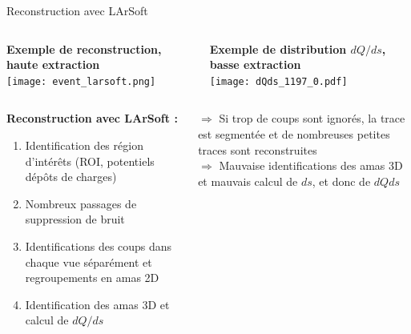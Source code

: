     \begin{frame}{Reconstruction avec LArSoft}
        \begin{scriptsize}
            \begin{columns}
                \begin{column}{0.65\textwidth}
                    \centering \textbf{Exemple de reconstruction, haute extraction}\\
                    \centering \texttt{[image: event\_larsoft.png]}
                \end{column}
                \begin{column}{0.35\textwidth}
                    \centering \textbf{Exemple de distribution $dQ/ds$, basse extraction}\\
                    \centering \texttt{[image: dQds\_1197\_0.pdf]}
                \end{column}
            \end{columns}\vfill
            \begin{columns}
                \begin{column}{0.5\textwidth}
                    \textbf{Reconstruction avec LArSoft :}
                    \begin{enumerate}
                        \item Identification des région d'intérêts (ROI, potentiels dépôts de charges)
                        \item Nombreux passages de suppression de bruit
                        \item Identifications des coups dans chaque vue séparément et regroupements en amas 2D
                        \item Identification des amas 3D et calcul de $dQ/ds$
                    \end{enumerate}
                \end{column}
                \begin{column}{0.5\textwidth}
                    $\Rightarrow$ Si trop de coups sont ignorés, la trace est segmentée et de nombreuses petites traces sont reconstruites\\
                    $\Rightarrow$ Mauvaise identifications des amas 3D et mauvais calcul de $ds$, et donc de $dQds$
                \end{column}
            \end{columns}
        \end{scriptsize}
    \end{frame}
    
